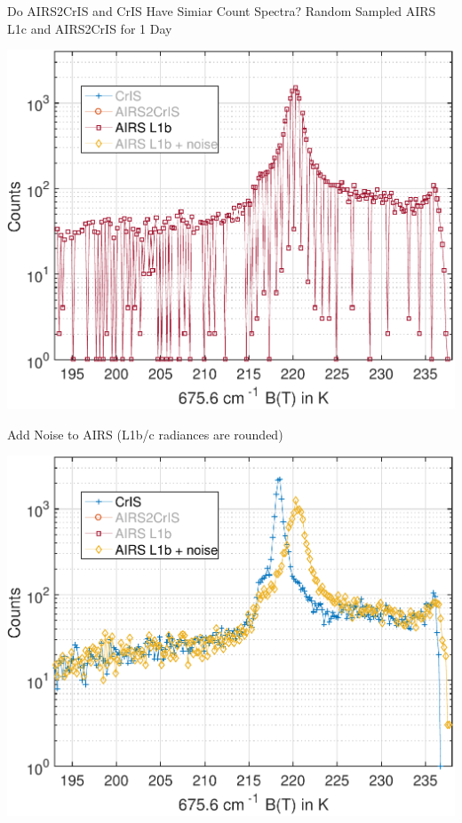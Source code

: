 \documentclass[10pt,t]{beamer}
\begin{document}
\begin{frame}[label={sec:org1dc5792}]{Do AIRS2CrIS and CrIS Have Simiar Count Spectra?}
\small Random Sampled AIRS L1c and AIRS2CrIS for 1 Day
\begin{center}
\includegraphics[width=0.7\linewidth]{./Figs/Pdf/jun4_2015_airs_675wn_global_counts.pdf}
\end{center}
\end{frame}
\begin{frame}[label={sec:org2841d2a}]{Add Noise to AIRS (L1b/c radiances are rounded)}
\begin{center}
\includegraphics[width=0.8\linewidth]{./Figs/Pdf/jun4_2015_airs_675wn_global_counts_w_airsnoise_and_cris.pdf}
\end{center}
\end{frame}
\end{document}
